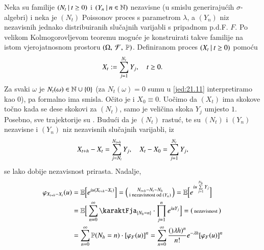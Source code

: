 \begin{pr}  \label{pr:21.10}
    Neka su familije $({N_t} \: | \: {t \geq 0})$ i $({Y_n } \: | \: {n \in \mathbb{N}})$ nezavisne (u smislu generiraju\' cih $\sigma$-algebri) i neka je $(N_t)$ Poissonov proces s parametrom $\lambda$, a $(Y_n)$ niz nezavisnih jednako distribuiranih slu\v cajnih varijabli s pripadnom p.d.F. $F$.
    Po velikom Kolmogorovljevom teoremu  mogu\' ce je konstruirati takve familije na istom vjerojatnosnom prostoru $(\Omega, \: \mathcal{F}, \: \mathbb{P})$.
    Definiranom proces $({X_t} \: | \: {t \geq 0})$ pomo\' cu
    \begin{equation}    \label{jed:21.11}
        X_t := \sum\limits_{j = 1}^{N_t} Y_j, \quad t \geq 0.
    \end{equation}
    Za svaki $\omega$ je $N_t(\omega) \in \mathbb{N} \cup \{0\}$ (za $N_t (\omega) = 0$ sumu u \eqref{jed:21.11} interpretiramo kao $0$), pa formalno ima smisla.
    O\v cito je i $X_0 \equiv 0$.
    Uo\v cimo da $(X_t)$ ima skokove to\v cno kada se dese skokovi za $(N_t)$, samo je veli\v cina skoka $Y_j$ umjesto $1$.
    Posebno, sve trajektorije su \cadlag.
    Budu\' ci da je $(N_t)$ rastu\' c, te su $(N_t)$ i $(Y_n)$ nezavisne i $(Y_n)$ niz nezavisnih slu\v cajnih varijabli, iz
    \begin{equation*}
        X_{t + h} - X_t = \sum\limits_{j = N_t}^{N_{t+ h}} Y_j, \quad X_t - X_0 = \sum\limits_{j = 1}^{N_t} Y_j,
    \end{equation*}
    se lako dobije nezavisnost prirasta.
    Nadalje,
    \begin{equation}    \label{jed:21.12}
        \begin{aligned}
            \varphi_{X_{t + h} - X_t} (u) &= \masE \Big[ e^{i u (X_{t + h} - X_t)} \Big] =
            \begin{psmallmatrix}
                N_{t + h} - N_t \sim N_h\\
                \textnormal{i nezavisnost od } (Y_n)
            \end{psmallmatrix} = \masE \Big[ e^{i u \suma{j = 1}{N_h} Y_j} \Big]\\
            &= \masE \Big[ \suma{n = 0}{\infty} \karaktFja_{\{ N_h = n\}} \cdot \produkt{j = 1}{n} e^{i u Y_j} \Big] =
            \begin{psmallmatrix}
                \textnormal{nezavisnost}
            \end{psmallmatrix}\\
            &= \suma{n = 0}{\infty} \masP (N_h = n) \cdot [ \varphi_F (u) ]^n = \suma{n = 0}{\infty} \frac{()\lambda h)^n}{n!} e^{-\lambda h} [\varphi_F (u)]^n\\

\end{aligned}
\end{equation}
\end{pr}

